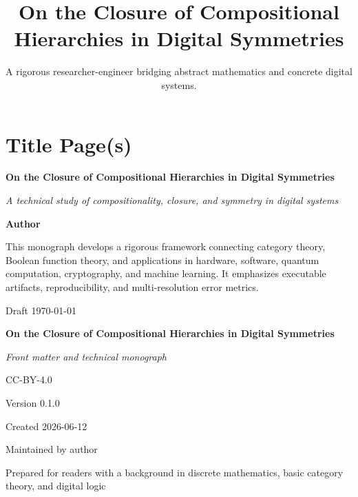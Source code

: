 \documentclass[11pt]{article}
\title{On the Closure of Compositional Hierarchies in Digital Symmetries}
\author{A rigorous researcher-engineer bridging abstract mathematics and concrete digital systems.}
\begin{document}
\section*{Title Page(s)}

\thispagestyle{empty}
\begin{titlepage}
\centering
\vspace*{0.12\textheight}

{\Huge\bfseries On the Closure of Compositional Hierarchies in Digital Symmetries\par}
\vspace{1.15em}

{\Large\itshape A technical study of compositionality, closure, and symmetry in digital systems\par}
\vspace{2.0em}

{\large\textbf{Author}\par}
\vfill

\begin{minipage}{0.84\textwidth}
\centering
This monograph develops a rigorous framework connecting category theory, Boolean function theory,
and applications in hardware, software, quantum computation, cryptography, and machine learning.
It emphasizes executable artifacts, reproducibility, and multi-resolution error metrics.
\end{minipage}

\vfill

{\large Draft \;\textbullet\; \today\par}
\vspace*{0.08\textheight}
\end{titlepage}

\cleardoublepage
\thispagestyle{empty}
\begin{titlepage}
\centering
\vspace*{0.18\textheight}

{\Huge\bfseries On the Closure of Compositional Hierarchies in Digital Symmetries\par}
\vspace{1.05em}
{\Large\itshape Front matter and technical monograph\par}
\vspace{1.8em}

{\large CC-BY-4.0\par}
\vspace{0.8em}
{\large Version 0.1.0\par}
\vspace{0.8em}
{\large Created 2026-06-12\par}
\vspace{0.8em}
{\large Maintained by author\par}

\vfill

{\large Prepared for readers with a background in discrete mathematics, basic category theory,
and digital logic\par}

\vspace*{0.12\textheight}
\end{titlepage}
\end{document}
